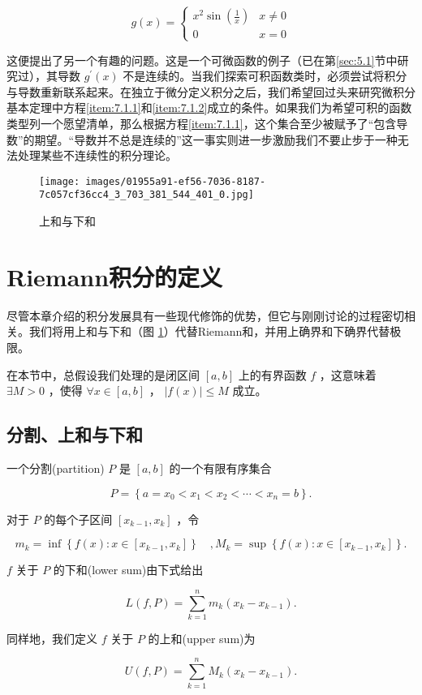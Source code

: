 \[
g\left( x\right)  = \left\{  \begin{array}{ll} {x}^{2}\sin \left( \frac{1}{x}\right) & x \neq  0 \\  0 & x = 0 \end{array}\right.
\]

这便提出了另一个有趣的问题。这是一个可微函数的例子（已在第\ref{sec:5.1}节中研究过），其导数 \({g}^{\prime }\left( x\right)\) 不是连续的。当我们探索可积函数类时，必须尝试将积分与导数重新联系起来。在独立于微分定义积分之后，我们希望回过头来研究微积分基本定理中方程\ref{item:7.1.1}和\ref{item:7.1.2}成立的条件。如果我们为希望可积的函数类型列一个愿望清单，那么根据方程\ref{item:7.1.1}，这个集合至少被赋予了“包含导数”的期望。“导数并不总是连续的”这一事实则进一步激励我们不要止步于一种无法处理某些不连续性的积分理论。

\begin{figure}[h]
  \centering
  \texttt{[image: images/01955a91-ef56-7036-8187-7c057cf36cc4\_3\_703\_381\_544\_401\_0.jpg]}
  \caption{上和与下和}
  \label{fig:7.2}
\end{figure}


\section{Riemann积分的定义}
\label{sec:7.2}
尽管本章介绍的积分发展具有一些现代修饰的优势，但它与刚刚讨论的过程密切相关。我们将用上和与下和（图 \ref{fig:7.2}）代替Riemann和，并用上确界和下确界代替极限。

在本节中，总假设我们处理的是闭区间 \(\left\lbrack  {a,b}\right\rbrack\) 上的有界函数 \(f\) ，这意味着 \( \exists M > 0\) ，使得 \( \forall x \in  \left\lbrack  {a,b}\right\rbrack\) ， \(\left| {f\left( x\right) }\right|  \leq  M\) 成立。

\subsection{分割、上和与下和}

\begin{Def}
  \label{def:7.2.1}
  一个分割(partition) \(P\) 是 \(\left\lbrack  {a,b}\right\rbrack\) 的一个有限有序集合

\[
P = \left\{  {a = {x}_{0} < {x}_{1} < {x}_{2} < \cdots  < {x}_{n} = b}\right\}  .
\]

对于 \(P\) 的每个子区间 \(\left\lbrack  {{x}_{k - 1},{x}_{k}}\right\rbrack\) ，令

\[
{m}_{k} = \inf \left\{  {f\left( x\right)  : x \in  \left\lbrack  {{x}_{k - 1},{x}_{k}}\right\rbrack  }\right\}  \quad, {M}_{k} = \sup \left\{  {f\left( x\right)  : x \in  \left\lbrack  {{x}_{k - 1},{x}_{k}}\right\rbrack  }\right\}  .
\]

\(f\) 关于 \(P\) 的下和(lower sum)由下式给出

\[
L\left( {f,P}\right)  = \mathop{\sum }\limits_{{k = 1}}^{n}{m}_{k}\left( {{x}_{k} - {x}_{k - 1}}\right) .
\]

同样地，我们定义 \(f\) 关于 \(P\) 的上和(upper sum)为

\[
U\left( {f,P}\right)  = \mathop{\sum }\limits_{{k = 1}}^{n}{M}_{k}\left( {{x}_{k} - {x}_{k - 1}}\right) .
\]
\end{Def}

